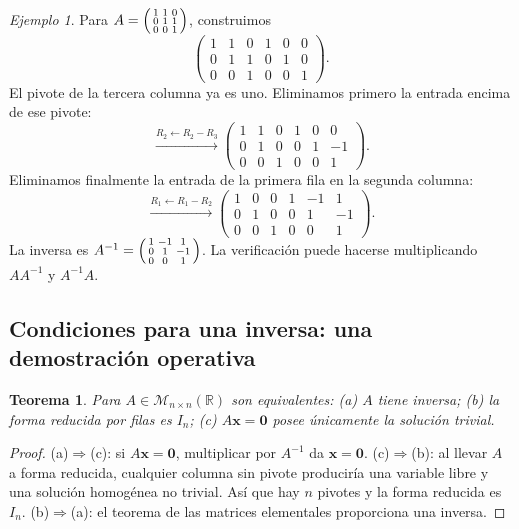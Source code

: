 \documentclass[12pt]{article}
\newtheorem{teorema}[definicion]{Teorema}
\theoremstyle{remark}
\newtheorem{ejemplo}[definicion]{Ejemplo}
\newcommand{\R}{\mathbb{R}}
\newcommand{\Mat}[2]{\mathcal{M}_{#1\times #2}}
\newcommand{\vect}[1]{\boldsymbol{#1}}
\begin{document}
\begin{ejemplo}
Para $A=\begin{psmallmatrix}1&1&0\\0&1&1\\0&0&1\end{psmallmatrix}$, construimos
\[
\left(\begin{array}{ccc|ccc}1&1&0&1&0&0\\0&1&1&0&1&0\\0&0&1&0&0&1\end{array}\right).
\]
El pivote de la tercera columna ya es uno. Eliminamos primero la entrada encima de ese pivote:
\[
\xrightarrow{R_2\leftarrow R_2-R_3}
\left(\begin{array}{ccc|ccc}1&1&0&1&0&0\\0&1&0&0&1&-1\\0&0&1&0&0&1\end{array}\right).
\]
Eliminamos finalmente la entrada de la primera fila en la segunda columna:
\[
\xrightarrow{R_1\leftarrow R_1-R_2}
\left(\begin{array}{ccc|ccc}1&0&0&1&-1&1\\0&1&0&0&1&-1\\0&0&1&0&0&1\end{array}\right).
\]
La inversa es $A^{-1}=\begin{psmallmatrix}1&-1&1\\0&1&-1\\0&0&1\end{psmallmatrix}$. La verificación puede hacerse multiplicando $AA^{-1}$ y $A^{-1}A$.
\end{ejemplo}
\subsection*{Condiciones para una inversa: una demostración operativa}
\begin{teorema}
Para $A\in\Mat{n}{n}(\R)$ son equivalentes: (a) $A$ tiene inversa; (b) la forma reducida por filas es $I_n$; (c) $A\vect x=\vect0$ posee únicamente la solución trivial.
\end{teorema}
\begin{proof}
(a)$\Rightarrow$(c): si $A\vect x=\vect0$, multiplicar por $A^{-1}$ da $\vect x=\vect0$. (c)$\Rightarrow$(b): al llevar $A$ a forma reducida, cualquier columna sin pivote produciría una variable libre y una solución homogénea no trivial. Así que hay $n$ pivotes y la forma reducida es $I_n$. (b)$\Rightarrow$(a): el teorema de las matrices elementales proporciona una inversa.
\end{proof}
\end{document}
